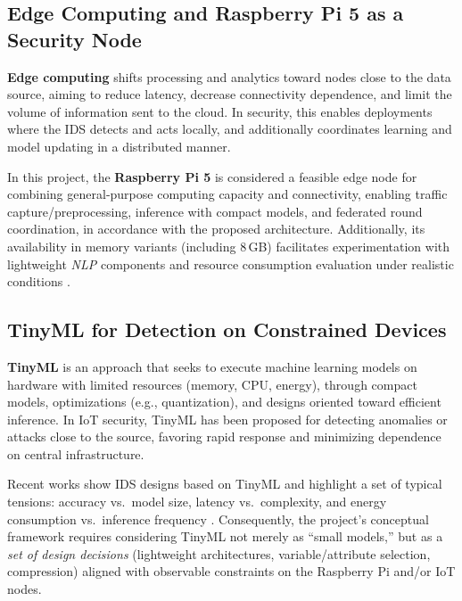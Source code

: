 \subsection{Edge Computing and Raspberry Pi 5 as a Security Node}
\textbf{Edge computing} shifts processing and analytics toward nodes close to the data source, aiming to reduce latency, decrease connectivity dependence, and limit the volume of information sent to the cloud. In security, this enables deployments where the IDS detects and acts locally, and additionally coordinates learning and model updating in a distributed manner.

\newline
\newline
In this project, the \textbf{Raspberry Pi 5} is considered a feasible edge node for combining general-purpose computing capacity and connectivity, enabling traffic capture/preprocessing, inference with compact models, and federated round coordination, in accordance with the proposed architecture. Additionally, its availability in memory variants (including 8\,GB) facilitates experimentation with lightweight \textit{NLP} components and resource consumption evaluation under realistic conditions \cite{RaspberryPi5Brief2026}.

\subsection{TinyML for Detection on Constrained Devices}
\textbf{TinyML} is an approach that seeks to execute machine learning models on hardware with limited resources (memory, CPU, energy), through compact models, optimizations (e.g., quantization), and designs oriented toward efficient inference. In IoT security, TinyML has been proposed for detecting anomalies or attacks close to the source, favoring rapid response and minimizing dependence on central infrastructure.

\newline
\newline
Recent works show IDS designs based on TinyML and highlight a set of typical tensions: accuracy vs.\ model size, latency vs.\ complexity, and energy consumption vs.\ inference frequency \cite{Amuthadevi2025,Alwaisi2024,Tekin2023}. Consequently, the project's conceptual framework requires considering TinyML not merely as ``small models,'' but as a \textit{set of design decisions} (lightweight architectures, variable/attribute selection, compression) aligned with observable constraints on the Raspberry Pi and/or IoT nodes.

